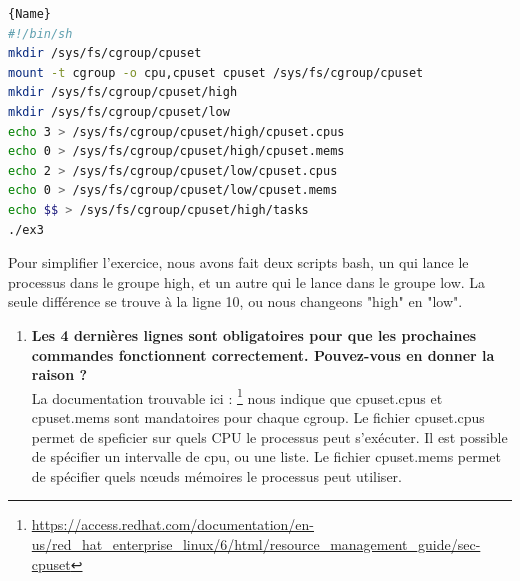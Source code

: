 \documentclass[
	a4paper, %
	10pt, %
]{CSUniSchoolLabReport}
\begin{document}
\begin{lstlisting}[language=bash, firstnumber=1]{Name}
#!/bin/sh
mkdir /sys/fs/cgroup/cpuset
mount -t cgroup -o cpu,cpuset cpuset /sys/fs/cgroup/cpuset
mkdir /sys/fs/cgroup/cpuset/high
mkdir /sys/fs/cgroup/cpuset/low
echo 3 > /sys/fs/cgroup/cpuset/high/cpuset.cpus
echo 0 > /sys/fs/cgroup/cpuset/high/cpuset.mems
echo 2 > /sys/fs/cgroup/cpuset/low/cpuset.cpus
echo 0 > /sys/fs/cgroup/cpuset/low/cpuset.mems
echo $$ > /sys/fs/cgroup/cpuset/high/tasks
./ex3
\end{lstlisting}
Pour simplifier l'exercice, nous avons fait deux scripts bash, un qui lance le processus dans le groupe high, et un autre qui le lance dans le groupe low.
La seule diff\'erence se trouve \`a la ligne 10, ou nous changeons "high" en "low".


\begin{enumerate}[label=\textbf{\arabic*}]
	\item \textbf{Les 4 dernières lignes sont obligatoires pour que les prochaines commandes fonctionnent correctement. Pouvez-vous en donner la raison ?}\\
	La documentation trouvable ici : \footnote{\href{https://access.redhat.com/documentation/en-us/red_hat_enterprise_linux/6/html/resource_management_guide/sec-cpuset}{https://access.redhat.com/documentation/en-us/red\_hat\_enterprise\_linux/6/html/resource\_management\_guide/sec-cpuset}}
	nous indique que cpuset.cpus et cpuset.mems sont mandatoires pour chaque cgroup.
	Le fichier cpuset.cpus permet de speficier sur quels CPU le processus peut s'ex\'ecuter. Il est possible de sp\'ecifier un intervalle de cpu, ou une liste.
	Le fichier cpuset.mems permet de sp\'ecifier quels n\oe{}uds m\'emoires le processus peut utiliser.
	

\end{enumerate}
\end{document}
